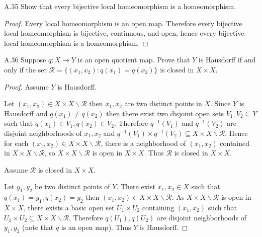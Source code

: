 \begin{exercise}{A.35}
    Show that every bijective local homeomorphism is a homeomorphism.
\end{exercise}

\begin{proof}
    Every local homeomorphism is an open map. Therefore every bijective local homeomorphism is bijective, continuous, and open, hence every bijective local homeomorphism is a homeomorphism.
\end{proof}

\begin{exercise}{A.36}
    Suppose \(q\colon X \to Y\) is an open quotient map.
    Prove that \(Y\) is Hausdorff if and only if the set
    \(\mathcal{R} = \{(x_{1}, x_{2}) : q(x_{1}) = q(x_{2})\}\) is closed in \(X \times X\).
\end{exercise}

\begin{proof}
    Assume \( Y \) is Hausdorff.

    Let \( (x_{1}, x_{2}) \in X \times X \smallsetminus \mathcal{R} \) then \( x_{1}, x_{2} \) are two distinct points in \( X \). Since \( Y \) is Hausdorff and \( q(x_{1}) \ne q(x_{2}) \) then there exist two disjoint open sets \( V_{1}, V_{2} \subseteq Y \) such that \( q(x_{1}) \in V_{1}, q(x_{2}) \in V_{2} \). Therefore \( q^{-1}(V_{1}) \) and \( q^{-1}(V_{2}) \) are disjoint neighborhoods of \( x_{1}, x_{2} \) and \( q^{-1}(V_{1}) \times q^{-1}(V_{2}) \subseteq X \times X \smallsetminus \mathcal{R} \). Hence for each \( (x_{1}, x_{2}) \in X \times X \smallsetminus \mathcal{R} \), there is a neighborhood of \( (x_{1}, x_{2}) \) contained in \( X \times X \smallsetminus \mathcal{R} \), so \( X \times X \smallsetminus \mathcal{R} \) is open in \( X \times X \). Thus \( \mathcal{R} \) is closed in \( X \times X \).

    Assume \( \mathcal{R} \) is closed in \( X \times X \).

    Let \( y_{1}, y_{2} \) be two distinct points of \( Y \). There exist \( x_{1}, x_{2} \in X \) such that \( q(x_{1}) = y_{1}, q(x_{2}) = y_{2} \) then \( (x_{1}, x_{2}) \in X \times X \smallsetminus \mathcal{R} \). As \( X \times X \smallsetminus \mathcal{R} \) is open in \( X \times X \), there exists a basic open set \( U_{1} \times U_{2} \) containing \( (x_{1}, x_{2}) \) such that \( U_{1} \times U_{2} \subseteq X \times X \smallsetminus \mathcal{R} \). Therefore \( q(U_{1}), q(U_{2}) \) are disjoint neighborhoods of \( y_{1}, y_{2} \) (note that \(q\) is an open map). Thus \( Y \) is Hausdorff.
\end{proof}

